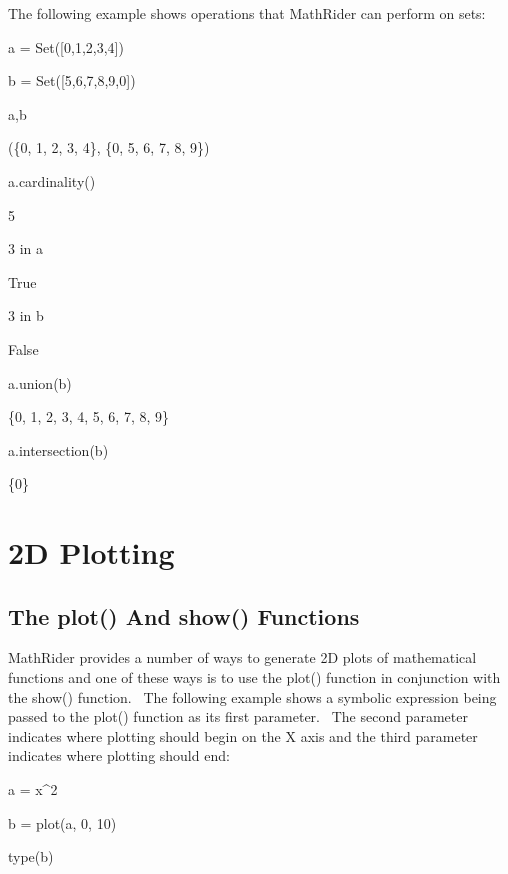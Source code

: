 \documentclass[12pt,twoside]{book}
\begin{document}
The following example shows operations that MathRider can perform on sets:


\bigskip

a = Set([0,1,2,3,4])

b = Set([5,6,7,8,9,0])

a,b

{\textbar}

(\{0, 1, 2, 3, 4\}, \{0, 5, 6, 7, 8, 9\})


\bigskip

a.cardinality()

{\textbar}

5


\bigskip

3 in a

{\textbar}

True


\bigskip

3 in b

{\textbar}

False


\bigskip

a.union(b)

{\textbar}

\{0, 1, 2, 3, 4, 5, 6, 7, 8, 9\}


\bigskip

a.intersection(b)

{\textbar}

\{0\}

\chapter[2D Plotting]{2D Plotting}

\section[The plot() And show() Functions]{The plot() And show() Functions}

MathRider provides a number of ways to generate 2D plots of mathematical functions and one of these ways is to use the plot() function in conjunction with the show() function. \ The following example shows a symbolic expression being passed to the plot() function as its first parameter. \ The second parameter indicates where plotting should begin on the X axis and the third parameter indicates where plotting should end:

a = x\^{}2

b = plot(a, 0, 10)

type(b)
\end{document}
